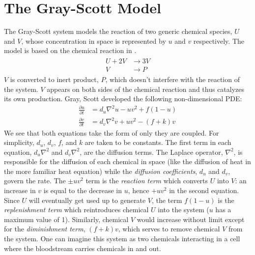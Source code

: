 \section{The Gray-Scott Model}
	The Gray-Scott system models the reaction of two generic chemical species, $U$ and $V$, whose concentration in space is represented by $u$ and $v$ respectively. The model is based on the chemical reaction in .
	\begin{align}
	\begin{split}
		U + 2V &\rightarrow 3V \\
		V &\rightarrow P
		\label{eq:gs-chem}
	\end{split}
	\end{align}
$V$ is converted to inert product, $P$, which doesn't interfere with the reaction of the system. $V$ appears on both sides of the chemical reaction and thus catalyzes its own production. Gray, Scott developed the following non-dimensional PDE:
	\begin{align}
		\frac{\partial u}{\partial t} & = d_u \nabla^2 u - uv^2 + f(1-u) \\
		\frac{\partial v}{\partial t} & = d_v \nabla^2 v  + uv^2 - (f +k)v
		\label{eq:gs}
	\end{align}
We see that both equations take the form of  only they are coupled. For simplicity, $d_u$, $d_v$, $f$, and $k$ are taken to be constants. The first term in each equation, $d_u \nabla^2$ and $d_v \nabla^2$, are the diffusion terms. The Laplace operator, $\nabla^2$, is responsible for the diffusion of each chemical in space (like the diffusion of heat in the more familiar heat equation) while the \textit{diffusion coefficients}, $d_u$ and $d_v$, govern the rate. The $\pm uv^2$ term is the  \textit{reaction term} which converts $U$ into $V$: an increase in $v$ is equal to the decrease in $u$, hence $+uv^2$ in the second equation. Since $U$ will eventually get used up to generate $V$, the term $f(1-u)$ is the \textit{replenishment term} which reintroduces chemical $U$ into the system ($u$ has a maximum value of 1). Similarly, chemical $V$ would increase without limit except for the \textit{diminishment term}, $(f+k)v$, which serves to remove chemical $V$ from the system. One can imagine this system as two chemicals interacting in a cell where the bloodstream carries chemicals in and out.
	
